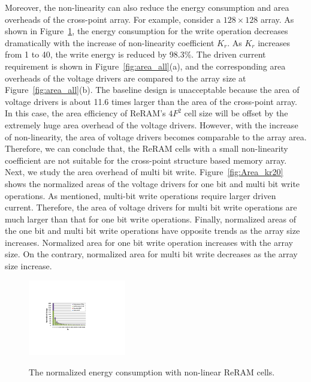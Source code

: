 Moreover, the non-linearity can also reduce the energy consumption and area overheads of the cross-point array. For example, consider a $128 \times 128$ array. As shown in Figure~\ref{fig:non_linear_energy}, the energy consumption for the write operation decreases dramatically with the increase of non-linearity coefficient $K_r$. As $K_r$ increases from 1 to 40, the write energy is reduced by 98.3\%. The driven current requirement is shown in Figure~\ref{fig:area_all}(a), and the corresponding area overheads of the voltage drivers are compared to the array size at Figure~\ref{fig:area_all}(b). The baseline design is unacceptable because the area of voltage drivers is about 11.6 times larger than the area of the cross-point array. In this case, the area efficiency of ReRAM's $4F^2$ cell size will be offset by the extremely huge area overhead of the voltage drivers. However, with the increase of non-linearity, the area of voltage drivers becomes comparable to the array area. Therefore, we can conclude that, the ReRAM cells with a small non-linearity coefficient are not suitable for the cross-point structure based memory array. Next, we study the area overhead of multi bit write. Figure~\ref{fig:Area_kr20} shows the normalized areas of the voltage drivers for one bit and multi bit write operations. As mentioned, multi-bit write operations require larger driven current. Therefore, the area of voltage drivers for multi bit write operations are much larger than that for one bit write operations. Finally, normalized areas of the one bit and multi bit write operations have opposite trends as the array size increases. Normalized area for one bit write operation increases with the array size. On the contrary, normalized area for multi bit write decreases as the array size increase.

\begin{figure}%
\centering
  \includegraphics[width=0.38\textwidth]{./figures/non_linear_energy.pdf}\\
  \caption{The normalized energy consumption with non-linear ReRAM cells.}\label{fig:non_linear_energy}
\end{figure}

